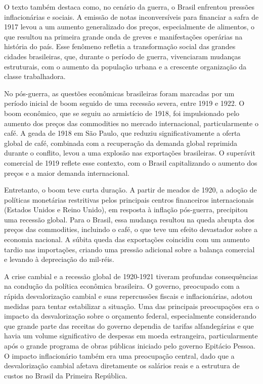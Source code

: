 \documentclass[a4paper,12pt]{article}[abntex2]
\begin{document}
O texto também destaca como, no cenário da guerra, o Brasil enfrentou pressões inflacionárias e sociais. A emissão de notas inconversíveis para financiar a safra de 1917 levou a um aumento generalizado dos preços, especialmente de alimentos, o que resultou na primeira grande onda de greves e manifestações operárias na história do país. Esse fenômeno refletia a transformação social das grandes cidades brasileiras, que, durante o período de guerra, vivenciaram mudanças estruturais, com o aumento da população urbana e a crescente organização da classe trabalhadora.

No pós-guerra, as questões econômicas brasileiras foram marcadas por um período inicial de boom seguido de uma recessão severa, entre 1919 e 1922. O boom econômico, que se seguiu ao armistício de 1918, foi impulsionado pelo aumento dos preços das commodities no mercado internacional, particularmente o café. A geada de 1918 em São Paulo, que reduziu significativamente a oferta global de café, combinada com a recuperação da demanda global reprimida durante o conflito, levou a uma explosão nas exportações brasileiras. O superávit comercial de 1919 reflete esse contexto, com o Brasil capitalizando o aumento dos preços e a maior demanda internacional.

Entretanto, o boom teve curta duração. A partir de meados de 1920, a adoção de políticas monetárias restritivas pelos principais centros financeiros internacionais (Estados Unidos e Reino Unido), em resposta à inflação pós-guerra, precipitou uma recessão global. Para o Brasil, essa mudança resultou na queda abrupta dos preços das commodities, incluindo o café, o que teve um efeito devastador sobre a economia nacional. A súbita queda das exportações coincidiu com um aumento tardio nas importações, criando uma pressão adicional sobre a balança comercial e levando à depreciação do mil-réis.

A crise cambial e a recessão global de 1920-1921 tiveram profundas consequências na condução da política econômica brasileira. O governo, preocupado com a rápida desvalorização cambial e suas repercussões fiscais e inflacionárias, adotou medidas para tentar estabilizar a situação. Uma das principais preocupações era o impacto da desvalorização sobre o orçamento federal, especialmente considerando que grande parte das receitas do governo dependia de tarifas alfandegárias e que havia um volume significativo de despesas em moeda estrangeira, particularmente após o grande programa de obras públicas iniciado pelo governo Epitácio Pessoa. O impacto inflacionário também era uma preocupação central, dado que a desvalorização cambial afetava diretamente os salários reais e a estrutura de custos no Brasil da Primeira República.
\end{document}

